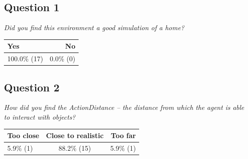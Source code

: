 \subsection{Question 1}\label{question1:1}
\emph{Did you find this environment a good simulation of a home?}
\begin{table}[H]
	\begin{center}
		\small \begin{tabular*}{0.35\columnwidth}{lr}
			\\ \hline \hline
			Yes & No \\ \hline \hline

		 	100.0\% (17) & 0.0\% (0)\\ \hline
		\end{tabular*}
	\end{center}
\end{table}

\subsection{Question 2}\label{question1:2}
\emph{How did you find the ActionDistance -- the distance from which the agent is able to interact with objects?}
\begin{table}[H]
	\begin{center}
		\small \begin{tabular*}{0.6\columnwidth}{lcr}
			\\ \hline \hline
			Too close & Close to realistic & Too far \\ \hline \hline

		 	5.9\% (1) & 88.2\% (15) & 5.9\% (1)\\ \hline
		\end{tabular*}
	\end{center}
\end{table}

